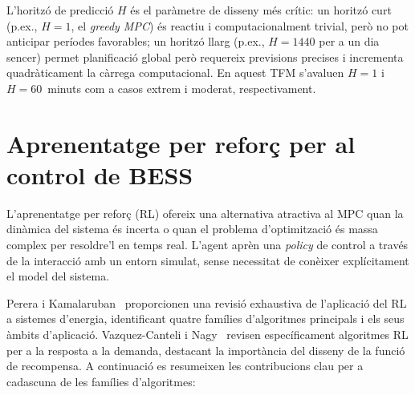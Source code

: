 \documentclass[a4paper,12pt,twoside]{ThesisStyle}
\begin{document}
L'horitzó de predicció $H$ és el paràmetre de disseny més crític: un horitzó curt (p.ex., $H=1$, el \textit{greedy MPC}) és reactiu i computacionalment trivial, però no pot anticipar períodes favorables; un horitzó llarg (p.ex., $H=1440$ per a un dia sencer) permet planificació global però requereix previsions precises i incrementa quadràticament la càrrega computacional. En aquest TFM s'avaluen $H=1$ i $H=60$~minuts com a casos extrem i moderat, respectivament.

\section{Aprenentatge per reforç per al control de BESS}

L'aprenentatge per reforç (RL) ofereix una alternativa atractiva al MPC quan la dinàmica del sistema és incerta o quan el problema d'optimització és massa complex per resoldre'l en temps real. L'agent aprèn una \textit{policy} de control a través de la interacció amb un entorn simulat, sense necessitat de conèixer explícitament el model del sistema.

Perera i Kamalaruban~\cite{perera2021rl} proporcionen una revisió exhaustiva de l'aplicació del RL a sistemes d'energia, identificant quatre famílies d'algoritmes principals i els seus àmbits d'aplicació. Vazquez-Canteli i Nagy~\cite{vazquez2019rl} revisen específicament algoritmes RL per a la resposta a la demanda, destacant la importància del disseny de la funció de recompensa. A continuació es resumeixen les contribucions clau per a cadascuna de les famílies d'algoritmes:
\end{document}
